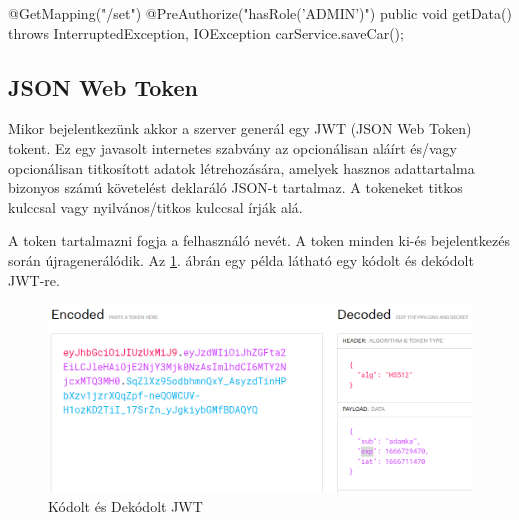 \begin{java}
@GetMapping("/set")
@PreAuthorize("hasRole('ADMIN')")
public void getData() throws InterruptedException,
IOException {
   carService.saveCar();
}
\end{java}
\newpage

\subsection{JSON Web Token}
Mikor bejelentkezünk akkor a szerver generál egy JWT (JSON Web Token)\cite{JWTexample} tokent. Ez egy javasolt internetes szabvány az opcionálisan aláírt és/vagy opcionálisan titkosított adatok létrehozására, amelyek hasznos adattartalma bizonyos számú követelést deklaráló JSON-t tartalmaz. A tokeneket titkos kulccsal vagy nyilvános/titkos kulccsal írják alá.

A token tartalmazni fogja a felhasználó nevét. A token minden ki-és bejelentkezés során újragenerálódik. 
Az \ref{fig:JWT}. ábrán egy példa látható egy kódolt és dekódolt JWT-re.

\begin{figure}[h]
\centering
\includegraphics[scale=0.6]{images/jwt.io.png}
\caption{Kódolt és Dekódolt JWT \cite{JWTexample}}
\label{fig:JWT}
\end{figure}